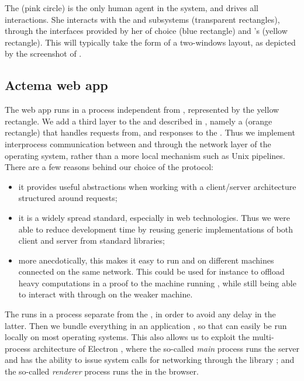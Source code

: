 The  (pink circle) is the only human agent in the system, and
drives all interactions. She interacts with the  and 
subsystems (transparent rectangles), through the interfaces provided by her
  of choice (blue rectangle) and 's
 (yellow rectangle). This will typically take the form of a
two-windows layout, as depicted by the screenshot of .

\subsection{Actema web app}

\AP
The  web app runs in a process independent from , represented
by the yellow  rectangle. We add a third layer to the
 and  described in , namely a
  (orange rectangle) that handles requests from, and
responses to the  . Thus we implement interprocess
communication between  and  through the network layer of the
operating system, rather than a more local mechanism such as Unix pipelines.
There are a few reasons behind our choice of the  protocol:
\begin{itemize}
  \item it provides useful abstractions when working with a client/server
    architecture structured around requests;
  \item it is a widely spread standard, especially in web technologies. Thus we
    were able to reduce development time by reusing generic implementations of
    both client and server from standard libraries;
  \item more anecdotically, this makes it easy to run  and 
    on different machines connected on the same network. This could be used for
    instance to offload heavy computations in a proof to the machine running
    , while still being able to interact with  through
     on the weaker machine.
\end{itemize}
The  runs in a process separate from the , in
order to avoid any delay in the latter. Then we bundle everything in an
 application \cite{Electron}, so that  can easily be
run locally on most operating systems. This also allows us to exploit the
multi-process architecture of Electron \cite{ElectronProcess}, where the
so-called \emph{main} process runs the server and has the ability to issue
system calls for networking through the   library
\cite{NodeJS}; and the so-called \emph{renderer} process runs the
 in the  browser.

